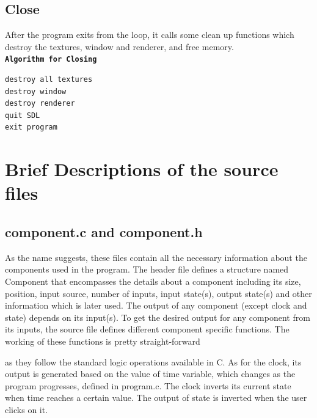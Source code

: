 \documentclass[report]{subfiles}
\begin{document}
    \subsection{Close}
    After the program exits from the loop, it calls some clean up functions which destroy the textures, window and renderer, and free memory.\\
        \textbf{\texttt{Algorithm for Closing}}
        \begin{verbatim}
destroy all textures
destroy window
destroy renderer
quit SDL
exit program
        \end{verbatim}
    \section{Brief Descriptions of the source files}
        \subsection{component.c and component.h}
    As the name suggests, these files contain all the necessary
    information about the components used in the program. The header
    file defines a structure named Component that encompasses the
    details about a component including its size, position, input source,
    number of inputs, input state(s), output state(s) and other
    information which is later used.
    The output of any component (except clock and state) depends on
    its input(s). To get the desired output for any component from its
    inputs, the source file defines different component specific
    functions. The working of these functions is pretty straight-forward

    as they follow the standard logic operations available in C. As for
    the clock, its output is generated based on the value of time
    variable, which changes as the program progresses, defined in
    program.c. The clock inverts its current state when time reaches a
    certain value. The output of state is inverted when the user clicks
    on it.
\end{document}
